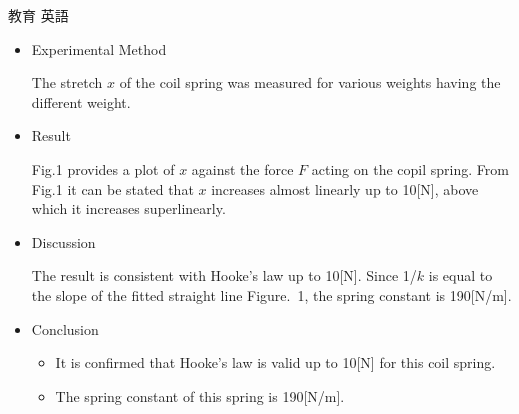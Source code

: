 \documentclass[fleqn]{jbook}
\begin{document}
\begin{answer}{教育 英語}{}
\begin{subanswers}
\begin{subsubanswers}
\begin{itemize}
The objective of this experiment is to confirm Hooke's law for a coil 
spring and measure the spring constant \( k\) of it.



\item Experimental Method

The stretch \( x\) of the coil spring was measured for various weights
having the different weight.



\item Result

Fig.1 provides a plot of \( x\) against the 
force \( F\) acting on the copil spring. From 
Fig.1 it can be stated that \( x\) increases 
almost linearly up to 10[N], above which it 
increases superlinearly.



\item Discussion

The result is consistent with Hooke's law up to 10[N]. Since 1/\( k\) is
equal to the slope of the fitted straight line Figure.~1, the spring constant
is 190[N/m].



\item Conclusion

\begin{itemize}
\item It is confirmed that Hooke's law is valid up to 10[N] for this coil
spring.
\item The spring constant of this spring is 190[N/m].
\end{itemize}
\end{itemize}

\baselineskip=15pt
\end{subsubanswers}

\end{subanswers}
\end{answer}
\end{document}
